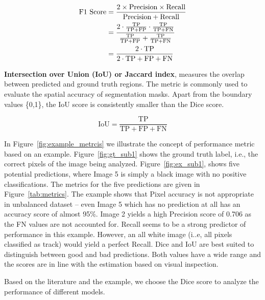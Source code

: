 \documentclass[Master,MDS,english]{BASE/twbook} %
\begin{document}
\begin{align*}
    \text{F1 Score} &= \frac{2 \times \text{Precision} \times \text{Recall}}{\text{Precision} + \text{Recall}} \\
    \vspace{1em}
     &= \frac{2 \cdot \frac{\text{TP}}{\text{TP} + \text{FP}} \cdot \frac{\text{TP}}{\text{TP} + \text{FN}}}{\frac{\text{TP}}{\text{TP} + \text{FP}} + \frac{\text{TP}}{\text{TP} + \text{FN}}} \\
    \vspace{1em}
     &= \frac{2 \cdot \text{TP}}{2 \cdot \text{TP} + \text{FP} + \text{FN}}
\end{align*}

\noindent\textbf{Intersection over Union (IoU) or Jaccard index}, measures the overlap between predicted and ground truth regions. The metric is commonly used to evaluate the spatial accuracy of segmentation masks. Apart from the boundary values \{0,1\}, the IoU score is consistently smaller than the Dice score.

\[
\text{IoU} = \frac{\text{TP}}{\text{TP} + \text{FP} + \text{FN}}
\]


In Figure~\ref{fig:example_metrcis} we illustrate the concept of performance metric based on an example. Figure~\ref{fig:gt_sub1} shows the ground truth label, i.e., the correct pixels of the image being analyzed. Figure~\ref{fig:ex_sub1}, shows five potential predictions, where Image 5 is simply a black image with no positive classifications. The metrics for the five predictions are given in Figure~\ref{tab:metrics}. The example shows that Pixel accuracy is not appropriate in unbalanced dataset -- even Image 5 which has no prediction at all has an accuracy score of almost 95\%. Image 2 yields a high Precision score of 0.706 as the FN values are not accounted for.  Recall seems to be a strong predictor of performance in this example. However, an all white image (i..e, all pixels classified as track) would yield a perfect Recall. Dice and IoU are best suited to distinguish between good and bad predictions. Both values have a wide range and the scores are in line with the estimation based on visual inspection.

Based on the literature and the example, we choose the Dice score to analyze the performance of different models.
\end{document}
